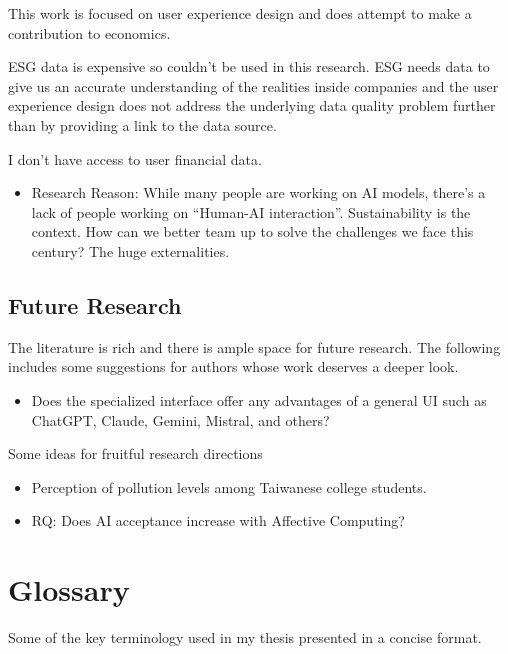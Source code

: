 \documentclass[
  letterpaper,
  DIV=11,
  numbers=noendperiod]{scrartcl}
\providecommand{\tightlist}{%
  \setlength{\itemsep}{0pt}\setlength{\parskip}{0pt}}\usepackage{longtable,booktabs,array}
\begin{document}
This work is focused on user experience design and does attempt to make
a contribution to economics.

ESG data is expensive so couldn't be used in this research. ESG needs
data to give us an accurate understanding of the realities inside
companies and the user experience design does not address the underlying
data quality problem further than by providing a link to the data
source.

I don't have access to user financial data.

\begin{itemize}
\tightlist
\item
  Research Reason: While many people are working on AI models, there's a
  lack of people working on ``Human-AI interaction''. Sustainability is
  the context. How can we better team up to solve the challenges we face
  this century? The huge externalities.
\end{itemize}

\subsection{Future Research}\label{future-research}

The literature is rich and there is ample space for future research. The
following includes some suggestions for authors whose work deserves a
deeper look.

\begin{itemize}
\tightlist
\item
  Does the specialized interface offer any advantages of a general UI
  such as ChatGPT, Claude, Gemini, Mistral, and others?
\end{itemize}

Some ideas for fruitful research directions

\begin{itemize}
\item
  Perception of pollution levels among Taiwanese college students.
\item
  RQ: Does AI acceptance increase with Affective Computing?
\end{itemize}

\newpage

\section{Glossary}\label{glossary}

Some of the key terminology used in my thesis presented in a concise
format.
\end{document}
